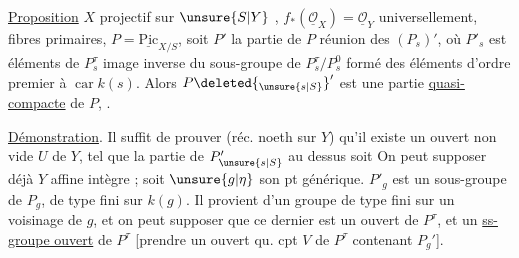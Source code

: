 \uline{Proposition} $X$ projectif sur $\unsure{S|Y}$ , $f_*(\underline{\mathcal O}_X)=\underline{\mathcal O}_Y$ universellement, fibres primaires, $P=\underline{\mathrm{Pic}}_{X/S}$, soit $P'$ la partie de $P$ réunion des $(P_s)'$, où $P'_s$ est  éléments de $P_s^\tau$ image inverse du sous-groupe de $P_s^\tau/P_s^0$ formé des éléments d'ordre premier à  $\operatorname{car} k(s)$.  Alors $P\deleted{_{\unsure{s|S}}}'$ est une partie   \uline{quasi-compacte} de $P$, .

\uline{Démonstration}. Il suffit de prouver (réc. noeth sur $Y$) qu'il existe un ouvert non vide $U$ de $Y$, tel que la partie de $P'_{\unsure{s|S}}$ au dessus soit  On peut supposer déjà $Y$ affine intègre ; soit $\unsure{g|\eta}$ son pt générique.  $P'_g$ est un sous-groupe  de $P_g$, de type fini sur $k(g)$. Il provient d'un groupe  de type fini sur un voisinage de $g$, et on peut supposer  que ce dernier est un ouvert de $P^\tau$, et  un \uline{ss-groupe ouvert} de $P^\tau$ [prendre un ouvert qu. cpt $V$ de $P^\tau$ contenant $P_g'$].
